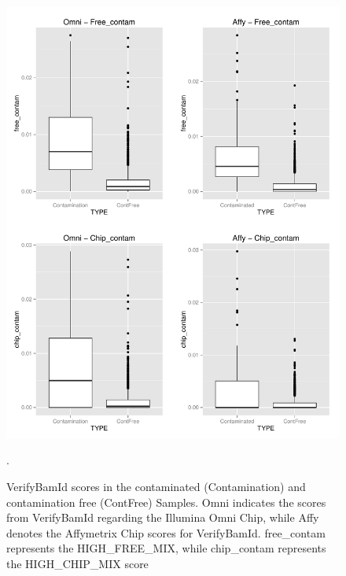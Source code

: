 \begin{itemize}
\begin{figure}[!ht]
    \centering
    \includegraphics[width=1\textwidth]{images/Result-VerifyBamId-check.pdf}
    \caption[VerifyBamId scores in the contaminated (Contamination) and contamination free (ContFree) Samples]{VerifyBamId scores in the contaminated (Contamination) and contamination free (ContFree) Samples. Omni indicates the scores from VerifyBamId regarding the Illumina Omni Chip, while Affy denotes the Affymetrix Chip scores for VerifyBamId. free\_contam represents the HIGH\_FREE\_MIX, while chip\_contam represents the HIGH\_CHIP\_MIX score}.  
    \label{contScores}
\end{figure}
\end{itemize}

